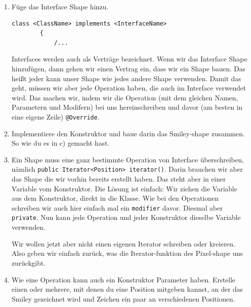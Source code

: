 \begin{enumerate}
    \item Füge das Interface Shape hinzu.
    \begin{lstlisting}[title=Interface Syntax,frame=ltr]
        class <ClassName> implements <InterfaceName>
        {
            /...
    \end{lstlisting}
    \begin{Infobox}[Interface]
        Interfaces werden auch als Verträge bezeichnet.
Wenn wir das Interface Shape hinzufügen, dann gehen wir einen Vertrag ein, dass wir ein Shape bauen.
Das heißt jeder kann unser Shape wie jedes andere Shape verwenden.
Damit das geht, müssen wir aber jede Operation haben, die auch im Interface verwendet wird.
Das machen wir, indem wir die Operation (mit dem gleichen Namen, Parametern und Modifern) bei uns hereinschreiben und davor (am besten in eine eigene Zeile) \lstinline{@Override}.
    \end{Infobox}    
    \item Implementiere den Konstruktor und baue darin das Smiley-shape zusammen. So wie du es in c) gemacht hast.
    \item Ein Shape muss eine ganz bestimmte Operation von Interface überschreiben, nämlich \lstinline{public Iterator<Position> iterator()}.
    Darin brauchen wir aber das Shape die wir vorhin bereits erstellt haben.
    Das steht aber in einer Variable vom Konstruktor.
    Die Lösung ist einfach: Wir ziehen die Variable aus dem Konstruktor, direkt in die Klasse.
    Wie bei den Operationen schreiben wir auch hier einfach mal ein  \lstinline{modifier} davor. Diesmal aber \lstinline{private}.
    Nun kann jede Operation und jeder Konstruktor dieselbe Variable verwenden.

    Wir wollen jetzt aber nicht einen eigenen Iterator schreiben oder kreieren. Also geben wir einfach zurück, was die Iterator-funktion des Pixel-shape uns zurückgibt.
\item Wie eine Operation kann auch ein Konstruktor Parameter haben.
Erstelle einen oder mehrere, mit denen du eine Position mitgeben kannst, an der das Smiley gezeichnet wird
und Zeichen ein paar an verschiedenen Positionen.
\end{enumerate}

\newpage
